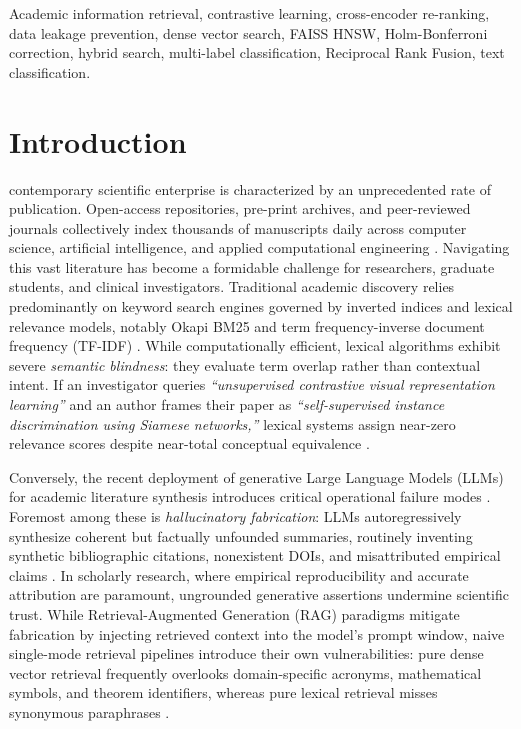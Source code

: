 \documentclass[journal]{IEEEtran}
\begin{document}
\begin{IEEEkeywords}
Academic information retrieval, contrastive learning, cross-encoder re-ranking, data leakage prevention, dense vector search, FAISS HNSW, Holm-Bonferroni correction, hybrid search, multi-label classification, Reciprocal Rank Fusion, text classification.
\end{IEEEkeywords}

\section{Introduction}
 contemporary scientific enterprise is characterized by an unprecedented rate of publication. Open-access repositories, pre-print archives, and peer-reviewed journals collectively index thousands of manuscripts daily across computer science, artificial intelligence, and applied computational engineering \cite{tennant2016academic}. Navigating this vast literature has become a formidable challenge for researchers, graduate students, and clinical investigators. Traditional academic discovery relies predominantly on keyword search engines governed by inverted indices and lexical relevance models, notably Okapi BM25 and term frequency-inverse document frequency (TF-IDF) \cite{salton1988term, robertson2009probabilistic}. While computationally efficient, lexical algorithms exhibit severe \textit{semantic blindness}: they evaluate term overlap rather than contextual intent. If an investigator queries \textit{``unsupervised contrastive visual representation learning''} and an author frames their paper as \textit{``self-supervised instance discrimination using Siamese networks,''} lexical systems assign near-zero relevance scores despite near-total conceptual equivalence \cite{chen2020simple}.

Conversely, the recent deployment of generative Large Language Models (LLMs) for academic literature synthesis introduces critical operational failure modes \cite{chang2024survey}. Foremost among these is \textit{hallucinatory fabrication}: LLMs autoregressively synthesize coherent but factually unfounded summaries, routinely inventing synthetic bibliographic citations, nonexistent DOIs, and misattributed empirical claims \cite{ji2023survey}. In scholarly research, where empirical reproducibility and accurate attribution are paramount, ungrounded generative assertions undermine scientific trust. While Retrieval-Augmented Generation (RAG) paradigms mitigate fabrication by injecting retrieved context into the model's prompt window, naive single-mode retrieval pipelines introduce their own vulnerabilities: pure dense vector retrieval frequently overlooks domain-specific acronyms, mathematical symbols, and theorem identifiers, whereas pure lexical retrieval misses synonymous paraphrases \cite{lewis2020retrieval}.
\end{document}
